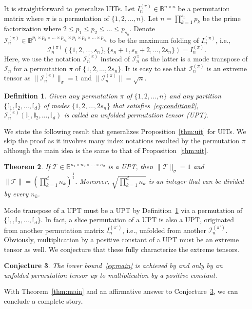 \documentclass[11pt]{article}
\newtheorem{theorem}{Theorem}[section]
\newtheorem{definition}[theorem]{Definition}
\newtheorem{conjecture}[theorem]{Conjecture}
\newcommand{\BB}{\mathbb{B}}
\newcommand{\BI}{\mathbb{I}}
\newcommand{\II}{\mathcal{I}}
\newcommand{\TT}{\mathcal{T}}
\begin{document}
It is straightforward to generalize UITs. Let $I^{(\pi)}_n\in\BB^{n\times n}$ be a permutation matrix where $\pi$ is a permutation of $\{1,2,\dots,n\}$. Let $n=\prod_{k=1}^{s_n} p_k$ be the prime factorization where $2\le p_1\le p_2\le \dots \le p_{s_n}$. Denote $\II^{(\pi)}_n\in\BB^{p_1\times p_2\times \dots \times p_{s_n}\times p_1 \times p_2\times\dots\times p_{s_n}}$ to be the maximum folding of $I^{(\pi)}_n$, i.e.,
$$
\II^{(\pi)}_n\left(\{1,2,\dots,s_n\},\{s_n+1,s_n+2,\dots,2s_n\}\right)=I^{(\pi)}_n.
$$
Here, we use the notation $\II^{(\pi)}_n$ instead of $\II^\pi_n$ as the latter is a mode transpose of $\II_n$ for a permutation $\pi$ of $\{1,2,\dots,2s_n\}$. It is easy to see that $\II^{(\pi)}_n$ is an extreme tensor as $\|\II^{(\pi)}_n\|_\sigma=1$ and $\|\II^{(\pi)}_n\|=\sqrt{n}$.
\begin{definition} \label{def:upt}
Given any permutation $\pi$ of $\{1,2,\dots,n\}$ and any partition $\{\BI_1, \BI_2,\dots, \BI_d\}$ of modes $\{1,2,\dots,2s_n\}$ that satisfies~\eqref{eq:condition2},
$\II^{(\pi)}_n(\BI_1, \BI_2,\dots, \BI_d)$ is called an unfolded permutation tensor (UPT).
\end{definition}

We state the following result that generalizes Proposition~\ref{thm:uit} for UITs. We skip the proof as it involves many index notations resulted by the permutation $\pi$ although the main idea is the same to that of Proposition~\ref{thm:uit}.
\begin{theorem}
If $\TT\in\BB^{n_1\times n_2\times \dots \times n_d}$ is a UPT, then $\|\TT\|_\sigma=1$ and $\|\TT\|=\left(\prod_{k=1}^dn_k\right)^{\frac{1}{4}}$. Moreover, $\sqrt{\prod_{k=1}^dn_k}$ is an integer that can be divided by every $n_k$.
\end{theorem}

Mode transpose of a UPT must be a UPT by Definition~\ref{def:upt} via a permutation of $\{\BI_1,\BI_2,\dots,\BI_d\}$. In fact, a slice permutation of a UPT is also a UPT, originated from another permutation matrix $I^{(\pi')}_n$, i.e., unfolded from another $\II^{(\pi')}_n$. Obviously, multiplication by a positive constant of a UPT must be an extreme tensor as well. We conjecture that these fully characterize the extreme tensors.
\begin{conjecture}\label{thm:con1}
The lower bound~\eqref{eq:main} is achieved by and only by an unfolded permutation tensor up to multiplication by a positive constant.
\end{conjecture}
With Theorem~\ref{thm:main} and an affirmative answer to Conjecture~\ref{thm:con1}, we can conclude a complete story.
\end{document}
